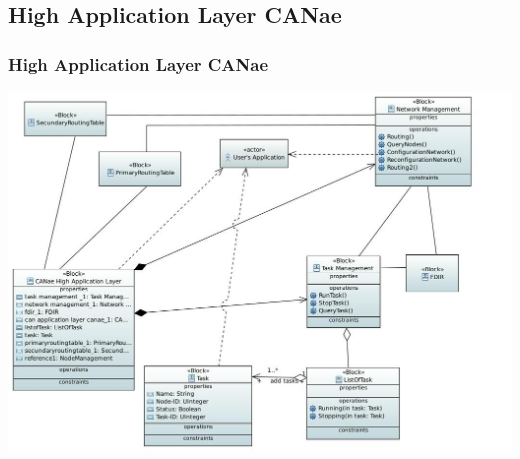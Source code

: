 \subsection{High Application Layer CANae}
\begin{frame}
	\frametitle{High Application Layer CANae}
	\centering
	\includegraphics[scale=0.3]{images/CANae_High_App_Layer.JPG}
\end{frame}